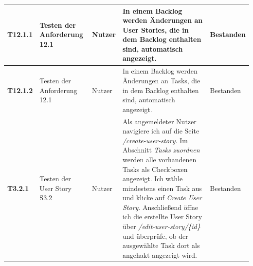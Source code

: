 \documentclass[a4paper,11pt]{article}
\begin{document}
\begin{longtable}{|p{3.3cm}|p{3.3cm}|p{3.3cm}|p{5.5cm}|p{3.3cm}|}
	\textbf{T12.1.1}                                                                                                                                                                                   &
	Testen der Anforderung 12.1                                                                                                                                                                        &
	Nutzer                                                                                                                                                                                             &
	In einem Backlog werden Änderungen an User Stories, die in dem Backlog enthalten sind, automatisch angezeigt.                                                                                      &
	Bestanden
	\\
	\hline

	\textbf{T12.1.2}                                                                                                                                                                                   &
	Testen der Anforderung 12.1                                                                                                                                                                        &
	Nutzer                                                                                                                                                                                             &
	In einem Backlog werden Änderungen an Tasks, die in dem Backlog enthalten sind, automatisch angezeigt.                                                                                             &
	Bestanden
	\\
	\hline

	\textbf{T3.2.1} &                                                                                                                                                                                    
	Testen der User Story S3.2 &                                                                                                                                                                        
	Nutzer &                                                                                                                                                                                             
	Als angemeldeter Nutzer navigiere ich auf die Seite \textit{/create-user-story}. Im Abschnitt \textit{Tasks zuordnen} werden alle vorhandenen Tasks als Checkboxen angezeigt. Ich wähle mindestens einen Task aus und klicke auf \textit{Create User Story}. Anschließend öffne ich die erstellte User Story über \textit{/edit-user-story/\{id\}} und überprüfe, ob der ausgewählte Task dort als angehakt angezeigt wird. &                                                                                                    
	Bestanden
	\\
	\hline


\end{longtable}
\end{document}
